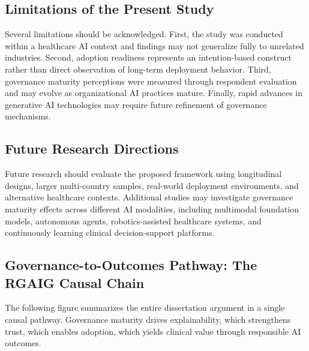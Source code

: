 \subsection{Limitations of the Present Study}
\label{sec:ch5_limitations}

\noindent Several limitations should be acknowledged. First, the study was conducted within a healthcare AI context and findings may not generalize fully to unrelated industries. Second, adoption readiness represents an intention-based construct rather than direct observation of long-term deployment behavior. Third, governance maturity perceptions were measured through respondent evaluation and may evolve as organizational AI practices mature. Finally, rapid advances in generative AI technologies may require future refinement of governance mechanisms.


\subsection{Future Research Directions}
\label{sec:ch5_future_research}

\noindent Future research should evaluate the proposed framework using longitudinal designs, larger multi-country samples, real-world deployment environments, and alternative healthcare contexts. Additional studies may investigate governance maturity effects across different AI modalities, including multimodal foundation models, autonomous agents, robotics-assisted healthcare systems, and continuously learning clinical decision-support platforms.


\subsection{Governance-to-Outcomes Pathway: The RGAIG Causal Chain}
\label{sec:governance_pathway_figure}

\noindent The following figure summarizes the entire dissertation argument in a single causal pathway. Governance maturity drives explainability, which strengthens trust, which enables adoption, which yields clinical value through responsible AI outcomes.

